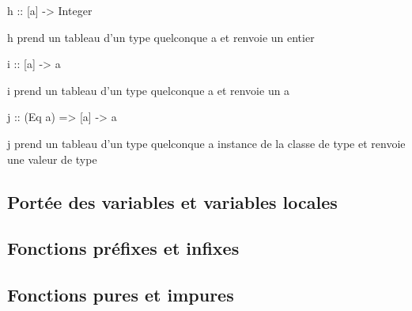 \begin{haskellcode}
h :: [a] -> Integer
\end{haskellcode}

h prend un tableau d'un type quelconque a  et renvoie un entier

\begin{haskellcode}
i :: [a] -> a
\end{haskellcode}

i prend un tableau d'un type quelconque a et renvoie un a

\begin{haskellcode}
j :: (Eq a) => [a] -> a
\end{haskellcode}

j prend un tableau d'un type quelconque a instance de la classe de type   et renvoie une valeur de type 

\subsection{Portée des variables et variables locales}

\subsection{Fonctions préfixes et infixes}

\subsection{Fonctions pures et impures}
